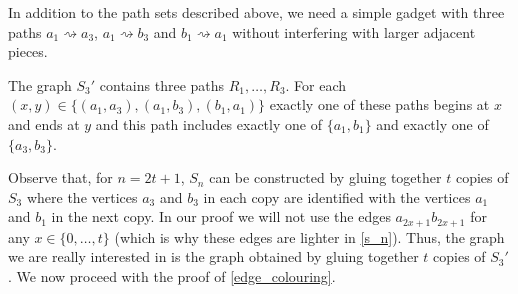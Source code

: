 \documentclass{patmorin}
\begin{document}
In addition to the path sets described above, we need a simple gadget with three paths $a_1\rightsquigarrow a_3$, $a_1\rightsquigarrow b_3$ and $b_1\rightsquigarrow a_1$ without interfering with larger adjacent pieces.


\begin{lem}
    The graph $S_3'$ contains three paths $R_1,\ldots,R_3$. For each $(x,y)\in\{(a_1,a_3),(a_1,b_3),(b_1,a_1)\}$ exactly one of these paths begins at $x$ and ends at $y$ and this path includes exactly one of $\{a_1,b_1\}$ and exactly one of $\{a_3,b_3\}$.
\end{lem}

Observe that, for $n=2t+1$, $S_n$ can be constructed by gluing together $t$ copies of $S_3$ where the vertices $a_3$ and $b_3$ in each copy are identified with the vertices $a_1$ and $b_1$ in the next copy.  In our proof we will not use the edges $a_{2x+1}b_{2x+1}$ for any $x\in\{0,\ldots,t\}$  (which is why these edges are lighter in \cref{s_n}).  Thus, the graph we are really interested in is the graph obtained by gluing together $t$ copies of $S_3'$.  We now proceed with the proof of \cref{edge_colouring}.
\end{document}
